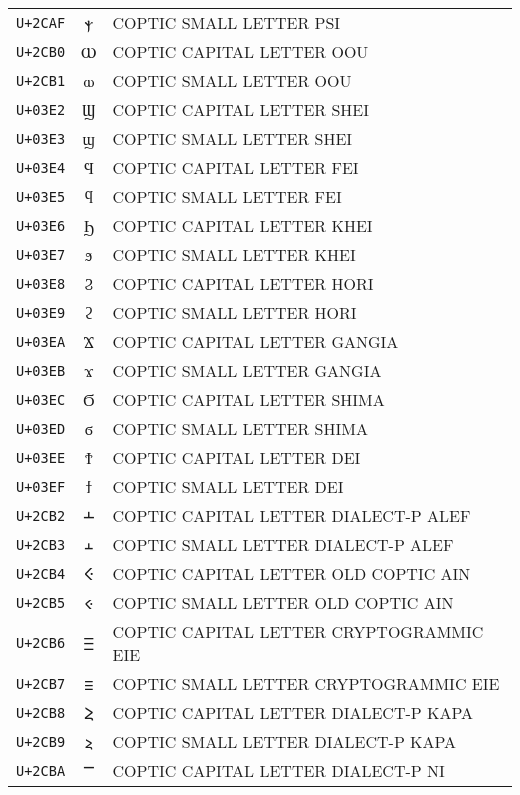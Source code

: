 \documentclass[10pt,a4paper]{article}
\newcommand{\coptic}[1]{{\copticfont #1}}
\begin{document}
\begin{longtable}{C C L}
\texttt{U+2CAF} & \coptic{ⲯ} & COPTIC SMALL LETTER PSI \\
\texttt{U+2CB0} & \coptic{Ⲱ} & COPTIC CAPITAL LETTER OOU \\
\texttt{U+2CB1} & \coptic{ⲱ} & COPTIC SMALL LETTER OOU \\
\texttt{U+03E2} & \coptic{Ϣ} & COPTIC CAPITAL LETTER SHEI \\
\texttt{U+03E3} & \coptic{ϣ} & COPTIC SMALL LETTER SHEI \\
\texttt{U+03E4} & \coptic{Ϥ} & COPTIC CAPITAL LETTER FEI \\
\texttt{U+03E5} & \coptic{ϥ} & COPTIC SMALL LETTER FEI \\
\texttt{U+03E6} & \coptic{Ϧ} & COPTIC CAPITAL LETTER KHEI \\
\texttt{U+03E7} & \coptic{ϧ} & COPTIC SMALL LETTER KHEI \\
\texttt{U+03E8} & \coptic{Ϩ} & COPTIC CAPITAL LETTER HORI \\
\texttt{U+03E9} & \coptic{ϩ} & COPTIC SMALL LETTER HORI \\
\texttt{U+03EA} & \coptic{Ϫ} & COPTIC CAPITAL LETTER GANGIA \\
\texttt{U+03EB} & \coptic{ϫ} & COPTIC SMALL LETTER GANGIA \\
\texttt{U+03EC} & \coptic{Ϭ} & COPTIC CAPITAL LETTER SHIMA \\
\texttt{U+03ED} & \coptic{ϭ} & COPTIC SMALL LETTER SHIMA \\
\texttt{U+03EE} & \coptic{Ϯ} & COPTIC CAPITAL LETTER DEI \\
\texttt{U+03EF} & \coptic{ϯ} & COPTIC SMALL LETTER DEI \\
\texttt{U+2CB2} & \coptic{Ⲳ} & COPTIC CAPITAL LETTER DIALECT-P ALEF \\
\texttt{U+2CB3} & \coptic{ⲳ} & COPTIC SMALL LETTER DIALECT-P ALEF \\
\texttt{U+2CB4} & \coptic{Ⲵ} & COPTIC CAPITAL LETTER OLD COPTIC AIN \\
\texttt{U+2CB5} & \coptic{ⲵ} & COPTIC SMALL LETTER OLD COPTIC AIN \\
\texttt{U+2CB6} & \coptic{Ⲷ} & COPTIC CAPITAL LETTER CRYPTOGRAMMIC EIE \\
\texttt{U+2CB7} & \coptic{ⲷ} & COPTIC SMALL LETTER CRYPTOGRAMMIC EIE \\
\texttt{U+2CB8} & \coptic{Ⲹ} & COPTIC CAPITAL LETTER DIALECT-P KAPA \\
\texttt{U+2CB9} & \coptic{ⲹ} & COPTIC SMALL LETTER DIALECT-P KAPA \\
\texttt{U+2CBA} & \coptic{Ⲻ} & COPTIC CAPITAL LETTER DIALECT-P NI \\

\end{longtable}
\end{document}
